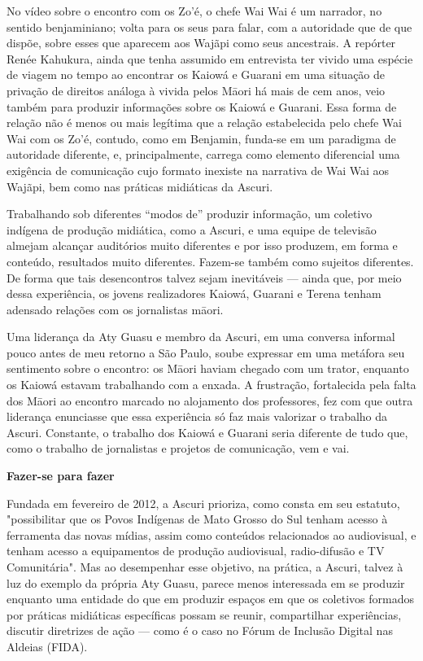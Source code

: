 No vídeo sobre o encontro com os Zo'é, o chefe Wai Wai é um narrador, no
sentido benjaminiano; volta para os seus para falar, com a autoridade
que de que dispõe, sobre esses que aparecem aos Wajãpi como seus
ancestrais. A repórter Renée Kahukura, ainda que tenha assumido em
entrevista ter vivido uma espécie de viagem no tempo ao encontrar os
Kaiowá e Guarani em uma situação de privação de direitos análoga à
vivida pelos Māori há mais de cem anos, veio também para produzir
informações sobre os Kaiowá e Guarani. Essa forma de relação não é menos
ou mais legítima que a relação estabelecida pelo chefe Wai Wai com os
Zo'é, contudo, como em Benjamin, funda-se em um paradigma de autoridade
diferente, e, principalmente, carrega como elemento diferencial uma
exigência de comunicação cujo formato inexiste na narrativa de Wai Wai
aos Wajãpi, bem como nas práticas midiáticas da Ascuri.

Trabalhando sob diferentes ``modos de'' produzir informação, um coletivo
indígena de produção midiática, como a Ascuri, e uma equipe de televisão
almejam alcançar auditórios muito diferentes e por isso produzem, em
forma e conteúdo, resultados muito diferentes. Fazem-se também como
sujeitos diferentes. De forma que tais desencontros talvez sejam
inevitáveis --- ainda que, por meio dessa experiência, os jovens
realizadores Kaiowá, Guarani e Terena tenham adensado relações com os
jornalistas māori.

Uma liderança da Aty Guasu e membro da Ascuri, em uma conversa informal
pouco antes de meu retorno a São Paulo, soube expressar em uma metáfora
seu sentimento sobre o encontro: os Māori haviam chegado com um trator,
enquanto os Kaiowá estavam trabalhando com a enxada. A frustração,
fortalecida pela falta dos Māori ao encontro marcado no alojamento dos
professores, fez com que outra liderança enunciasse que essa experiência
só faz mais valorizar o trabalho da Ascuri. Constante, o trabalho dos
Kaiowá e Guarani seria diferente de tudo que, como o trabalho de
jornalistas e projetos de comunicação, vem e vai.

\textbf{Fazer-se para fazer}

Fundada em fevereiro de 2012, a Ascuri prioriza, como consta em seu
estatuto, "possibilitar que os Povos Indígenas de Mato Grosso do Sul
tenham acesso à ferramenta das novas mídias, assim como conteúdos
relacionados ao audiovisual, e tenham acesso a equipamentos de produção
audiovisual, radio-difusão e TV Comunitária". Mas ao desempenhar esse
objetivo, na prática, a Ascuri, talvez à luz do exemplo da própria Aty
Guasu, parece menos interessada em se produzir enquanto uma entidade do
que em produzir espaços em que os coletivos formados por práticas
midiáticas específicas possam se reunir, compartilhar experiências,
discutir diretrizes de ação --- como é o caso no Fórum de Inclusão
Digital nas Aldeias (FIDA).

